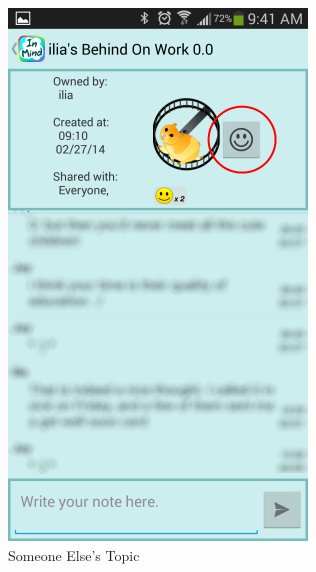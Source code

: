 \begin{figure}
\begin{subfigure}[b]{0.3\textwidth}
        \includegraphics[width=\textwidth]{topic_view_other.png}
        \caption{Someone Else's Topic}
      \end{subfigure}
      \begin{subfigure}[b]{0.3\textwidth}

\end{subfigure}
\end{figure}
